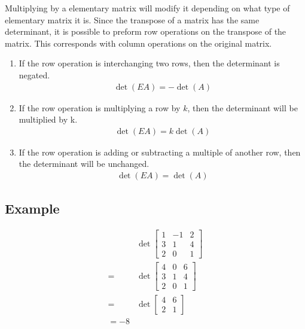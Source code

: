 \documentclass{article}
\theoremstyle{mytheoremstyle}
\theoremstyle{mytheoremstyle}
\theoremstyle{myproblemstyle}
\begin{document}
    Multiplying by a elementary matrix will modify it depending on what type of
    elementary matrix it is. Since the transpose of a matrix has the same
    determinant, it is possible to preform row operations on the transpose of
    the matrix. This corresponds with column operations on the original matrix.
    \begin{enumerate}
        \item If the row operation is interchanging two rows, then the
            determinant is negated.
            \begin{align*}
                \det(EA)=-\det(A)
            \end{align*}
        \item If the row operation is multiplying a row by $k$, then the
            determinant will be multiplied by k.
            \begin{align*}
                \det(EA)=k\det(A)
            \end{align*}
        \item If the row operation is adding or subtracting a multiple of
            another row, then the determinant will be unchanged.
            \begin{align*}
                \det(EA)=\det(A)
            \end{align*}
    \end{enumerate}

    \subsection*{Example}
    \begin{align*}
        &\det\begin{bmatrix}
            1 & -1 & 2 \\
            3 & 1 & 4 \\
            2 & 0 & 1
        \end{bmatrix} \\
        =&\det\begin{bmatrix}
            4 & 0 & 6 \\
            3 & 1 & 4 \\
            2 & 0 & 1
        \end{bmatrix} \\
        =&\det\begin{bmatrix}
            4 & 6 \\
            2 & 1
        \end{bmatrix} \\
        = -8
    \end{align*}
\end{document}
